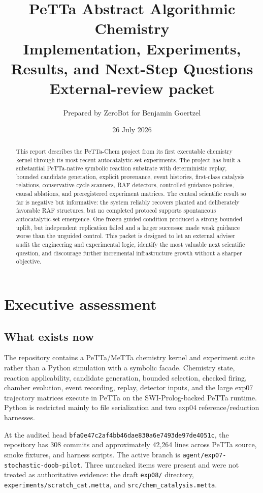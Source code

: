 \documentclass[11pt]{article}
\title{\textbf{PeTTa Abstract Algorithmic Chemistry}\\[4pt]
\large Implementation, Experiments, Results, and Next-Step Questions\\[8pt]
\normalsize External-review packet}
\author{Prepared by ZeroBot for Benjamin Goertzel}
\date{26 July 2026}
\newcommand{\code}[1]{\texttt{#1}}
\begin{document}
\maketitle

\begin{abstract}
This report describes the PeTTa-Chem project from its first executable chemistry
kernel through its most recent autocatalytic-set experiments.  The project has
built a substantial PeTTa-native symbolic reaction substrate with deterministic
replay, bounded candidate generation, explicit provenance, event histories,
first-class catalysis relations, conservative cycle scanners, RAF detectors,
controlled guidance policies, causal ablations, and preregistered experiment
matrices.  The central scientific result so far is negative but informative:
the system reliably recovers planted and deliberately favorable RAF structures,
but no completed protocol supports spontaneous autocatalytic-set emergence.
One frozen guided condition produced a strong bounded uplift, but independent
replication failed and a larger successor made weak guidance worse than the
unguided control.  This packet is designed to let an external adviser audit the
engineering and experimental logic, identify the most valuable next scientific
question, and discourage further incremental infrastructure growth without a
sharper objective.
\end{abstract}

\tableofcontents
\newpage

\section{Executive assessment}

\subsection{What exists now}

The repository contains a PeTTa/MeTTa chemistry kernel and experiment suite
rather than a Python simulation with a symbolic facade.  Chemistry state,
reaction applicability, candidate generation, bounded selection, checked
firing, chamber evolution, event recording, replay, detector inputs, and the
large exp07 trajectory matrices execute in PeTTa on the SWI-Prolog-backed PeTTa
runtime.  Python is restricted mainly to file serialization and two exp04
reference/reduction harnesses.

At the audited head \code{bfa0e47c2af4bb46dae830a6e7493de97de4051c},
the repository has 308 commits and approximately 42,264 lines across PeTTa
source, smoke fixtures, and harness scripts.  The active branch is
\code{agent/exp07-stochastic-doob-pilot}.  Three untracked items were present
and were not treated as authoritative evidence: the draft \code{exp08/}
directory, \code{experiments/scratch\_cat.metta}, and
\code{src/chem\_catalysis.metta}.
\end{document}
